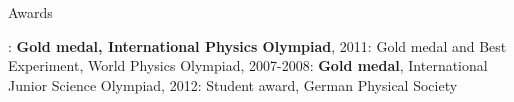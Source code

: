 \begin{rubric}{Awards}

\newcommand\textbox[1]{%
  \parbox{\textwidth}{#1}%
}
  \textbox{
: \textbf{Gold medal, International Physics Olympiad}, 2011: Gold medal and Best Experiment, World Physics Olympiad, 2007-2008: \textbf{Gold medal}, International Junior Science Olympiad, 2012: Student award, German Physical Society}
\end{rubric}
